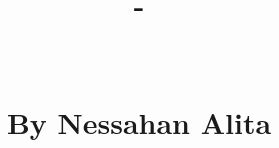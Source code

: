 \documentclass[a4paper, 12pt]{article}
\title{%
	\Large \textbf{\textsc{\bookseries \space - \bookvolume}} \\
	\hfill \break%
	\huge \textbf{\booktitle} \\
	\hfill \break%
	\large \textbf{\booksubtitle} \\
	\hfill \break%
	\hfill \break%
	\hfill \break%
	\small \textbf{By Nessahan Alita} \\
	\hfill \break%
	\hfill \break%
	\hfill \break%
	\citationdata \\
	\hfill \break%
	\summary \\
	\hfill \break%
	\keywords%
}
\date{}
\author{}
\begin{document}
\maketitle
\justifying



\normalsize
\tableofcontents












\end{document}
